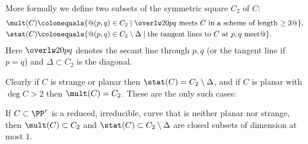 More formally we define two subsets of the symmetric square $C_2$ of $C$:
%
%
$$
\begin{aligned}
 \mult(C) &\colonequals \{@(p,q) \in C_2 \mid \overlw20{pq} \hbox{ meets
 $C$ in a scheme of length $\geq 3$}@\},\\
\stat(C) &\colonequals  \{@(p,q) \in C_2\setminus \Delta \mid  \hbox{the
tangent lines to $C$ at $p,q$ meet}
@\}.
\end{aligned}
$$
Here
$\overlw20{pq}$ 
denotes the secant line through $p,q$ (or the
tangent line if $p=q$) and $\Delta\subset C_2$
is the diagonal.


Clearly if $C$ is strange or planar then $\stat(C) = C_2\setminus \Delta$, 
and
if $C$ is
planar with $\deg C>2$ then $\mult(C) = C_2$.
These are the only such cases:

\begin{proposition}\label{mult and stat}
 If $C\subset \PP^r$ is a reduced, irreducible, curve that is neither
 planar nor strange, then $\mult(C)\subset C_2$
 and $\stat(C)\subset C_2\setminus \Delta$ are closed subsets of dimension
at most
 $1$.
\unif
\end{proposition}

